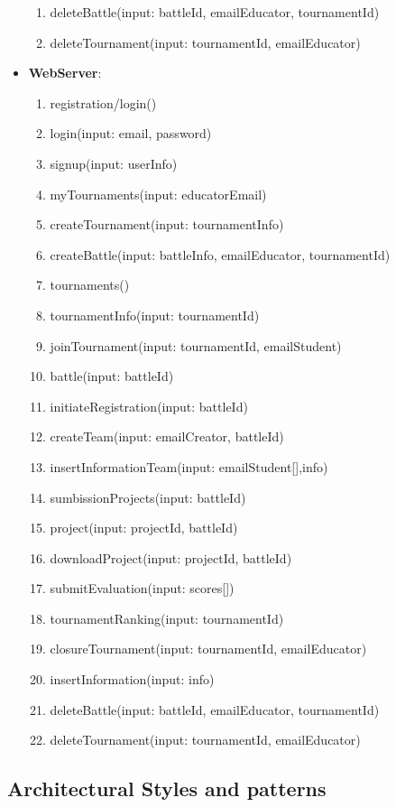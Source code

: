 \begin{itemize}
\begin{enumerate}
    \item  deleteBattle(input: battleId, emailEducator, tournamentId)
    \item deleteTournament(input: tournamentId, emailEducator)
\end{enumerate}
\item \textbf{WebServer}:\begin{enumerate}
    \item registration/login()
    \item login(input: email, password)
    \item signup(input: userInfo)
    \item myTournaments(input: educatorEmail)
    \item createTournament(input: tournamentInfo)
    \item createBattle(input: battleInfo, emailEducator, tournamentId)
    \item tournaments()
    \item tournamentInfo(input: tournamentId)
    \item joinTournament(input: tournamentId, emailStudent)
    \item battle(input: battleId)
    \item initiateRegistration(input: battleId)
    \item createTeam(input: emailCreator, battleId)
    \item insertInformationTeam(input: emailStudent[],info)
    \item sumbissionProjects(input: battleId)
    \item project(input: projectId, battleId)
    \item downloadProject(input: projectId, battleId)
    \item submitEvaluation(input: scores[])
    \item tournamentRanking(input: tournamentId)
    \item closureTournament(input: tournamentId, emailEducator) 
    \item insertInformation(input: info)
    \item deleteBattle(input: battleId, emailEducator, tournamentId)
    \item deleteTournament(input: tournamentId, emailEducator)
\end{enumerate}

\end{itemize}

\subsection{Architectural Styles and patterns}
